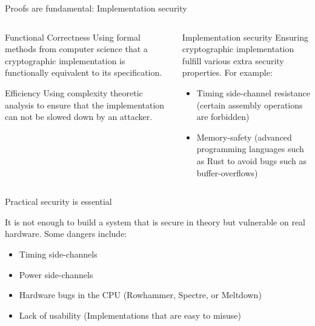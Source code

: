 \begin{frame}{Proofs are fundamental: Implementation security}
  \begin{columns}[t,fullwidth]

    \begin{column}{.40\textwidth}
      \begin{block}{Functional Correctness}
        Using formal methods from computer science that a cryptographic implementation is functionally equivalent to its specification.
      \end{block}
      
      \vfill

      \begin{block}{Efficiency}
        Using complexity theoretic analysis to ensure that the implementation can not be slowed down by an attacker.
      \end{block}
    \end{column}

    \begin{column}{.55\textwidth}
      \begin{block}{Implementation security}
        Ensuring cryptographic implementation fulfill various extra security properties.
        For example:
        \vfill
        \begin{itemize}
          \item Timing side-channel resistance (certain assembly operations are forbidden)
          \item Memory-safety (advanced programming languages such as Rust to avoid bugs such as buffer-overflows)
        \end{itemize}
      \end{block}
    \end{column}
  \end{columns}

\end{frame}

\begin{frame}{Practical security is essential}
  \small

  It is not enough to build a system that is secure in theory but vulnerable on real hardware.
  Some dangers include:

  \begin{itemize}
    \item Timing side-channels
    \item Power side-channels
    \item Hardware bugs in the CPU (Rowhammer, Spectre, or Meltdown)
    \item Lack of usability (Implementations that are easy to misuse)
  \end{itemize}
\end{frame}


